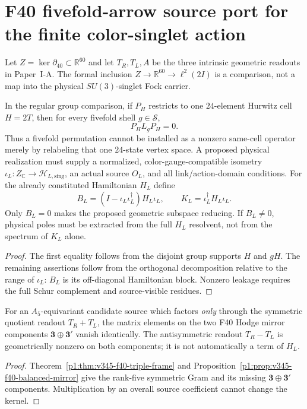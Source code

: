 \documentclass[12pt,a4paper]{article}
\begin{document}
\clearpage
\section{F40 fivefold-arrow source port for the finite color-singlet action}
\label{p10:sec:v345-f40-source-port}
Let $Z=\ker\partial_{40}\subset\mathbb R^{60}$ and let
$T_R,T_L,A$ be the three intrinsic geometric readouts in
Paper~I-A.  The formal inclusion
$Z\to\mathbb R^{60}\to\ell^2(2I)$ is a comparison, not a map
into the physical $SU(3)$-singlet Fock carrier.

\begin{proposition}
\label{p10:prop:v345-f40-qcd-source-obligation}
In the regular group comparison, if $P_H$ restricts to one
$24$-element Hurwitz cell $H=2T$, then for every fivefold shell
$g\in\mathcal S$,
\[
 \boxed{P_HL_gP_H=0.}
\]
Thus a fivefold permutation cannot be installed as a nonzero
same-cell operator merely by relabeling that one $24$-state
vertex space.  A proposed physical realization must supply a
normalized, color-gauge-compatible isometry
$\iota_L:Z_{\mathbb C}\to\mathcal H_{L,\mathrm{sing}}$, an
actual source $O_L$, and all link/action-domain conditions.
For the already constituted Hamiltonian $H_L$ define
\[
 B_L=(I-\iota_L\iota_L^\dagger)H_L\iota_L,
 \qquad K_L=\iota_L^\dagger H_L\iota_L.
\]
Only $B_L=0$ makes the proposed geometric subspace reducing.
If $B_L\ne0$, physical poles must be extracted from the full
$H_L$ resolvent, not from the spectrum of $K_L$ alone.
\end{proposition}
\begin{proof}
The first equality follows from the disjoint group supports
$H$ and $gH$.  The remaining assertions follow from the
orthogonal decomposition relative to the range of $\iota_L$:
$B_L$ is its off-diagonal Hamiltonian block.  Nonzero leakage
requires the full Schur complement and source-visible residues.
\end{proof}

\begin{corollary}
\label{p10:cor:v345-f40-symmetric-source-null}
For an $A_5$-equivariant candidate source which factors
\emph{only} through the symmetric quotient readout $T_R+T_L$,
the matrix elements on the two F40 Hodge mirror components
$\mathbf3\oplus\mathbf3'$ vanish identically.  The
antisymmetric readout $T_R-T_L$ is geometrically nonzero on
both components; it is not automatically a term of $H_L$.
\end{corollary}
\begin{proof}
Theorem~\ref{p1:thm:v345-f40-triple-frame} and
Proposition~\ref{p1:prop:v345-f40-balanced-mirror} give the
rank-five symmetric Gram and its missing $\mathbf3\oplus
\mathbf3'$ components.  Multiplication by an overall source
coefficient cannot change the kernel.
\end{proof}
\end{document}
